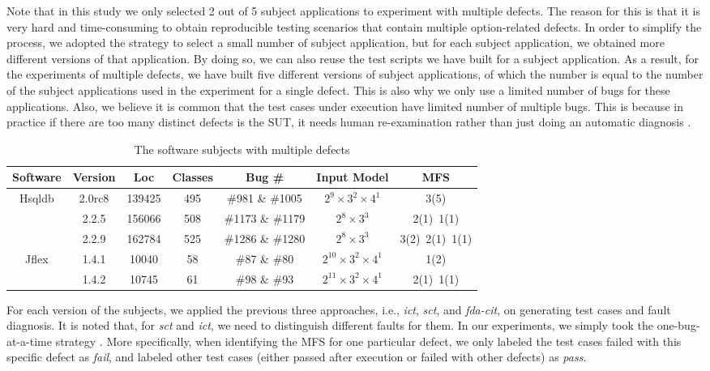 \documentclass[journal,12pt,onecolumn,draftclsnofoot,]{IEEEtran}
\begin{document}
{\color{red}Note that in this study we only selected 2 out of 5 subject applications to experiment with multiple defects. The reason for this is that it is very hard and time-consuming to obtain reproducible testing scenarios that contain multiple option-related defects. In order to simplify the process, we adopted the strategy to select a small number of subject application, but for each subject application, we obtained more different versions of that application. By doing so, we can also reuse the test scripts we have built for a subject application. As a result, for the experiments of multiple defects, we have built five different versions of subject applications, of which the number is equal to the number of the subject applications used in the experiment for a single defect. This is also why we only use a limited number of bugs for these applications. Also, we believe it is common that the test cases under execution have limited number of multiple bugs. This is because in practice if there are too many distinct defects is the SUT, it needs human re-examination rather than just doing an automatic diagnosis \cite{zhang2011characterizing}.}

\begin{table}[ht]
\caption{The software subjects with multiple defects}
\label{multiple_defects_subjects}
\centering
\begin{tabular}{|c|c|c|c|c|c|c|} \hline
Software&  Version & Loc & Classes & Bug \# & Input Model & MFS\\ \hline

Hsqldb& 2.0rc8 & 139425 & 495 &  \#981 \& \#1005 & $2^{9}\times 3^{2} \times 4^{1}$ & 3(5)\\
	  &2.2.5 & 156066 & 508 & \#1173 \&  \#1179 & $2^{8} \times 3^{3}$ & 2(1)\ 1(1)\\
	    &2.2.9 & 162784 &525 & \#1286 \& \#1280 & $2^{8} \times 3^{3}$ & 3(2)\ 2(1)\ 1(1)\\ \hline
Jflex& 1.4.1 &  10040 &58 & \#87 \& \#80  & $2^{10} \times 3^{2} \times 4^{1}$ & 1(2)\\
    &  1.4.2 &  10745 &61 &  \#98 \& \#93 & $2^{11} \times 3^{2} \times 4^{1}$ & 2(1)\ 1(1)\\ \hline
\end{tabular}
\end{table}

For each version of the subjects, we applied the previous three approaches, i.e., \emph{ict}, \emph{sct}, and \emph{fda-cit}, on generating test cases and fault diagnosis. It is noted that, for \emph{sct} and \emph{ict}, we need to distinguish different faults for them. In our experiments, we simply took the one-bug-at-a-time strategy \cite{wong2016survey}. More specifically, when identifying the MFS for one particular defect, we only labeled the test cases failed with this specific defect as \emph{fail}, and labeled other test cases (either passed after execution or failed with other defects) as \emph{pass}.
\end{document}
